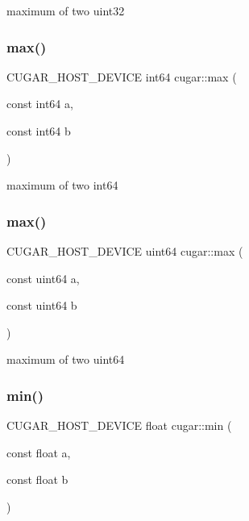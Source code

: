 maximum of two uint32 \mbox{\label{group___basic_ga73436f2862d38a231bd77222838d5aed}} 
\subsubsection{\texorpdfstring{max()}{max()}\hspace{0.1cm}{\footnotesize\ttfamily [7/8]}}
{\footnotesize\ttfamily C\+U\+G\+A\+R\+\_\+\+H\+O\+S\+T\+\_\+\+D\+E\+V\+I\+CE int64 cugar\+::max (\begin{DoxyParamCaption}\item[{const int64}]{a,  }\item[{const int64}]{b }\end{DoxyParamCaption})\hspace{0.3cm}{\ttfamily [inline]}}

maximum of two int64 \mbox{\label{group___basic_ga6e9a695197d693dac4c2561830268fdb}} 
\subsubsection{\texorpdfstring{max()}{max()}\hspace{0.1cm}{\footnotesize\ttfamily [8/8]}}
{\footnotesize\ttfamily C\+U\+G\+A\+R\+\_\+\+H\+O\+S\+T\+\_\+\+D\+E\+V\+I\+CE uint64 cugar\+::max (\begin{DoxyParamCaption}\item[{const uint64}]{a,  }\item[{const uint64}]{b }\end{DoxyParamCaption})\hspace{0.3cm}{\ttfamily [inline]}}

maximum of two uint64 \mbox{\label{group___basic_ga7359b06cac70a9ebdc0cec435a22dc78}} 
\subsubsection{\texorpdfstring{min()}{min()}\hspace{0.1cm}{\footnotesize\ttfamily [1/8]}}
{\footnotesize\ttfamily C\+U\+G\+A\+R\+\_\+\+H\+O\+S\+T\+\_\+\+D\+E\+V\+I\+CE float cugar\+::min (\begin{DoxyParamCaption}\item[{const float}]{a,  }\item[{const float}]{b }\end{DoxyParamCaption})\hspace{0.3cm}{\ttfamily [inline]}}

